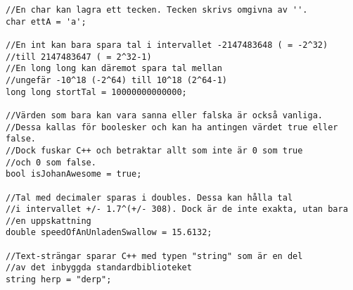 \begin{lstlisting}
//En char kan lagra ett tecken. Tecken skrivs omgivna av ''.
char ettA = 'a';

//En int kan bara spara tal i intervallet -2147483648 ( = -2^32)
//till 2147483647 ( = 2^32-1)
//En long long kan däremot spara tal mellan 
//ungefär -10^18 (-2^64) till 10^18 (2^64-1)
long long stortTal = 10000000000000;

//Värden som bara kan vara sanna eller falska är också vanliga.
//Dessa kallas för boolesker och kan ha antingen värdet true eller false.
//Dock fuskar C++ och betraktar allt som inte är 0 som true
//och 0 som false.
bool isJohanAwesome = true;

//Tal med decimaler sparas i doubles. Dessa kan hålla tal
//i intervallet +/- 1.7^(+/- 308). Dock är de inte exakta, utan bara
//en uppskattning
double speedOfAnUnladenSwallow = 15.6132;

//Text-strängar sparar C++ med typen "string" som är en del
//av det inbyggda standardbiblioteket
string herp = "derp";
\end{lstlisting}
